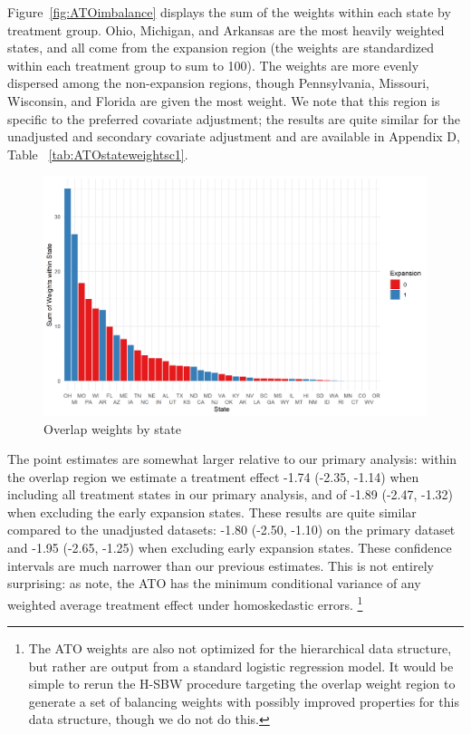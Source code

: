 Figure~\ref{fig:ATOimbalance} displays the sum of the weights within each state by treatment group. Ohio, Michigan, and Arkansas are the most heavily weighted states, and all come from the expansion region (the weights are standardized within each treatment group to sum to 100). The weights are more evenly dispersed among the non-expansion regions, though Pennsylvania, Missouri, Wisconsin, and Florida are given the most weight. We note that this region is specific to the preferred covariate adjustment; the results are quite similar for the unadjusted and secondary covariate adjustment and are available in Appendix D, Table ~\ref{tab:ATOstateweightsc1}.

\begin{figure}[H]
\begin{center}
    \caption{Overlap weights by state}
    \label{ATOarea}
    \includegraphics[scale=0.6]{01_plots/oate-region-c1-a.png}
\end{center}
\end{figure}

The point estimates are somewhat larger relative to our primary analysis: within the overlap region we estimate a treatment effect -1.74 (-2.35, -1.14) when including all treatment states in our primary analysis, and of -1.89 (-2.47, -1.32) when excluding the early expansion states. These results are quite similar compared to the unadjusted datasets: -1.80 (-2.50, -1.10) on the primary dataset and -1.95 (-2.65, -1.25) when excluding early expansion states. These confidence intervals are much narrower than our previous estimates. This is not entirely surprising: as \cite{li2018balancing} note, the ATO has the minimum conditional variance of any weighted average treatment effect under homoskedastic errors. \footnote{The ATO weights are also not optimized for the hierarchical data structure, but rather are output from a standard logistic regression model. It would be simple to rerun the H-SBW procedure targeting the overlap weight region to generate a set of balancing weights with possibly improved properties for this data structure, though we do not do this.}




